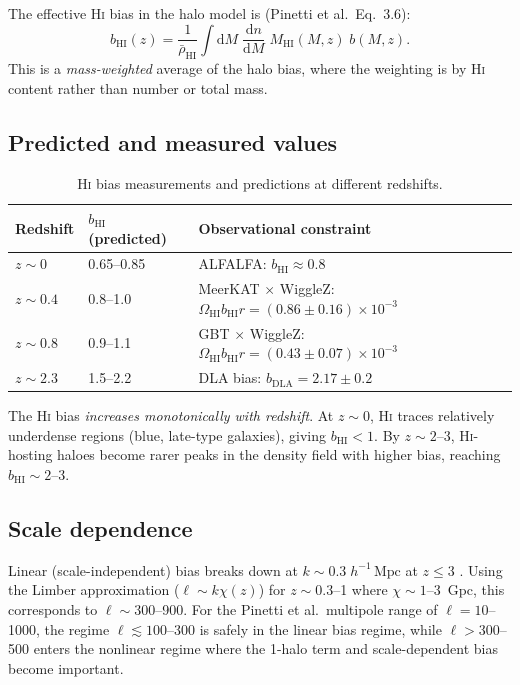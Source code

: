 \documentclass[10pt,a4paper]{article}
\newcommand{\OmHI}{\Omega_{\mathrm{HI}}}
\newcommand{\bHI}{b_{\mathrm{HI}}}
\newcommand{\MHI}{M_{\mathrm{HI}}}
\newcommand{\hmpc}{h^{-1}\,\mathrm{Mpc}}
\begin{document}
The effective H\textsc{i} bias in the halo model is (Pinetti et al.\ Eq.~3.6):
\begin{equation}
  \label{eq:bHI}
  \boxed{
  \bHI(z) = \frac{1}{\bar{\rho}_{\mathrm{HI}}}
  \int \mathrm{d}M\;\frac{\mathrm{d}n}{\mathrm{d}M}\;
  \MHI(M, z)\;b(M, z).
  }
\end{equation}
This is a \emph{mass-weighted} average of the halo bias, where the weighting
is by H\textsc{i} content rather than number or total mass.


\subsection{Predicted and measured values}

\begin{table}[htbp]
\centering
\caption{H\textsc{i} bias measurements and predictions at different redshifts.}
\label{tab:bHI}
\begin{tabular}{@{}lll@{}}
\toprule
Redshift & $\bHI$ (predicted) & Observational constraint \\
\midrule
$z \sim 0$   & 0.65--0.85 & ALFALFA: $\bHI \approx 0.8$ \citep{Martin2012} \\
$z \sim 0.4$ & 0.8--1.0   & MeerKAT $\times$ WiggleZ:
  $\OmHI \bHI r = (0.86 \pm 0.16) \times 10^{-3}$ \citep{Cunnington2023} \\
$z \sim 0.8$ & 0.9--1.1   & GBT $\times$ WiggleZ:
  $\OmHI \bHI r = (0.43 \pm 0.07) \times 10^{-3}$ \citep{Masui2013} \\
$z \sim 2.3$ & 1.5--2.2   & DLA bias:
  $b_{\mathrm{DLA}} = 2.17 \pm 0.2$ \citep{FontRibera2012} \\
\bottomrule
\end{tabular}
\end{table}

The H\textsc{i} bias \emph{increases monotonically with redshift}.  At
$z \sim 0$, H\textsc{i} traces relatively underdense regions (blue, late-type
galaxies), giving $\bHI < 1$.  By $z \sim 2$--3, H\textsc{i}-hosting haloes
become rarer peaks in the density field with higher bias, reaching
$\bHI \sim 2$--3.


\subsection{Scale dependence}

Linear (scale-independent) bias breaks down at
$k \sim 0.3\;\hmpc$ at $z \le 3$ \citep{VillaescusaNavarro2018,Castorina2017}.
Using the Limber approximation ($\ell \sim k \chi(z)$) for $z \sim 0.3$--1
where $\chi \sim 1$--3~Gpc, this corresponds to $\ell \sim 300$--900.  For the
Pinetti et al.\ multipole range of $\ell = 10$--1000, the regime
$\ell \lesssim 100$--300 is safely in the linear bias regime, while
$\ell > 300$--500 enters the nonlinear regime where the 1-halo term and
scale-dependent bias become important.
\end{document}
